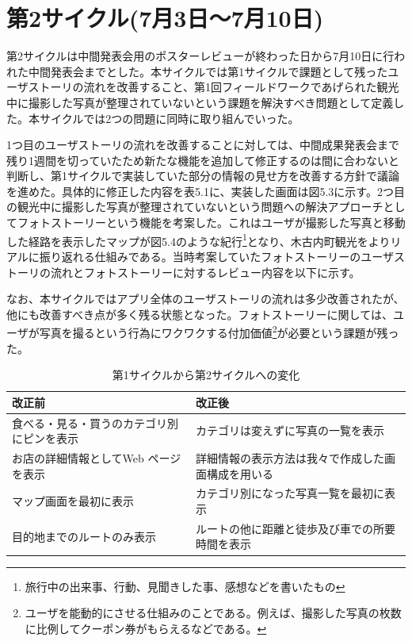 \section{第2サイクル(7月3日〜7月10日)}
第2サイクルは中間発表会用のポスターレビューが終わった日から7月10日に行われた中間発表会までとした。本サイクルでは第1サイクルで課題として残ったユーザストーリの流れを改善すること、第1回フィールドワークであげられた観光中に撮影した写真が整理されていないという課題を解決すべき問題として定義した。本サイクルでは2つの問題に同時に取り組んでいった。
\par 1つ目のユーザストーリの流れを改善することに対しては、中間成果発表会まで残り1週間を切っていたため新たな機能を追加して修正するのは間に合わないと判断し、第1サイクルで実装していた部分の情報の見せ方を改善する方針で議論を進めた。具体的に修正した内容を表5.1に、実装した画面は図5.3に示す。2つ目の観光中に撮影した写真が整理されていないという問題への解決アプローチとしてフォトストーリーという機能を考案した。これはユーザが撮影した写真と移動した経路を表示したマップが図5.4のような紀行\footnote{旅行中の出来事、行動、見聞きした事、感想などを書いたもの}となり、木古内町観光をよりリアルに振り返れる仕組みである。当時考案していたフォトストーリーのユーザストーリの流れとフォトストーリーに対するレビュー内容を以下に示す。
\par なお、本サイクルではアプリ全体のユーザストーリの流れは多少改善されたが、他にも改善すべき点が多く残る状態となった。フォトストーリーに関しては、ユーザが写真を撮るという行為にワクワクする付加価値\footnote{ユーザを能動的にさせる仕組みのことである。例えば、撮影した写真の枚数に比例してクーポン券がもらえるなどである。}が必要という課題が残った。

\begin{table}[htb]
\centering
\caption{第1サイクルから第2サイクルへの変化}
  \begin{tabular}{|l|l|} \hline
    改正前&改正後  \\ \hline 
    食べる・見る・買うのカテゴリ別にピンを表示 & \parbox{20zw}{カテゴリは変えずに写真の一覧を表示} \\  \hline
    お店の詳細情報としてWeb ページを表示 &\parbox{20zw}{詳細情報の表示方法は我々で作成した画面構成を用いる}\\ \hline
    マップ画面を最初に表示 & \parbox{20zw}{カテゴリ別になった写真一覧を最初に表示}\\ \hline
    目的地までのルートのみ表示 & \parbox{20zw}{ルートの他に距離と徒歩及び車での所要時間を表示} \\ \hline
  \end{tabular} 
\end{table}

